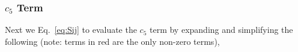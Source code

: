 \subsubsection{$c_{5}$ Term}
Next we Eq.~\ref{eq:Sij} to evaluate the $c_{5}$ term by expanding and
simplifying the following (note: terms in red are the only non-zero terms), 
